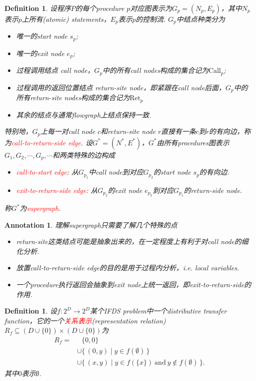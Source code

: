 \documentclass{article}
\newtheorem{definition}[theorem]{Definition}
\newtheorem{annotation}[theorem]{Annotation}
\newcommand*{\xfunc}[4]{{#2}\colon{#3}{#1}{#4}}
\newcommand*{\func}[3]{\xfunc{\to}{#1}{#2}{#3}}
\newcommand\Set[2]{\{\,#1\mid#2\,\}} %
\newcommand{\redt}[1]{\textcolor{red}{#1}}
\begin{document}
\begin{definition}
\rm 设程序$P$的每个procedure $p$对应图表示为$G_p=(N_p, E_p)$，其中$N_p$表示$p$上所有(atomic) statements，$E_p$表示$p$的控制流. $G_p$中结点种类分为
\begin{itemize}
	\item 唯一的start node $s_p$;
	\item 唯一的exit node $e_p$;
	\item 过程调用结点 call node，$G_p$中的所有call nodes构成的集合记为$\text{Call}_p$;
	\item 过程调用的返回位置结点 return-site node，即紧跟在call node后面，$G_p$中的所有return-site nodes构成的集合记为$\text{Ret}_p$
	\item 其余的结点与通常flowgraph上结点保持一致. 
\end{itemize}
特别地，$G_p$上每一对call node $c$和return-site node $r$直接有一条$c$到$r$的有向边，称为\redt{call-to-return-side edge}. 设$G^*=(N^*,E^*)$，$G^*$由所有procedures图表示$G_1,G_2,\cdots,
G_p,\cdots$和两类特殊的边构成
\begin{itemize}
	\item \redt{call-to-start edge}: 从$G_{p_1}$中call node到对应$G_{p_2}$的start node $s_p$的有向边.
	\item \redt{exit-to-return-side edge}: 从$G_{p_2}$的exit node $e_{p_2}$到对应$G_{p_1}$的return-side node. 
\end{itemize}
称$G^*$为\redt{supergraph}.
\end{definition}


\begin{annotation}
\rm 理解supergraph只需要了解几个特殊的点
\begin{itemize}
	\item return-site这类结点可能是抽象出来的，在一定程度上有利于对call node的细化分析.
	\item 放置call-to-return-side edge的目的是用于过程内分析，i.e. local variables.
	\item 一个procedure执行返回会抽象到exit node上统一返回，即exit-to-return-side的作用.
\end{itemize} 
\end{annotation}

\begin{definition}
\rm 设$\func{f}{2^D}{2^D}$某个IFDS problem中一个distributive transfer function，它的一个\redt{关系表示}(representation relation) $R_f \subseteq (D \cup \{0\}) \times (D \cup \{0\})$为
$$
\begin{aligned}
R_f = &~~~ \{0,0\} \\
&\cup \Set{(0,y)}{y \in f(\emptyset)} \\ 
&\cup  \Set{(x,y)}{y \in f(\{x\})~\text{and}~y \notin f(\emptyset)}.
\end{aligned}
$$
其中$0$表示$\emptyset$. 
\end{definition}
\end{document}
